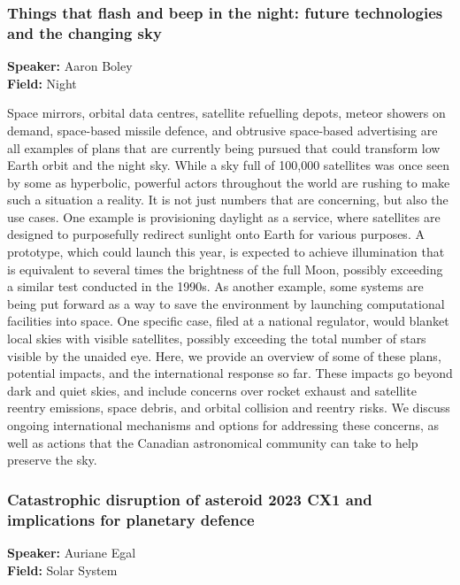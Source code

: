 \hypertarget{abstract-talk-305}{}\label{abstract-page-talk-305}
\subsubsection*{Things that flash and beep in the night: future technologies and the changing sky}
\textbf{Speaker:} Aaron Boley\\
\textbf{Field:} Night

Space mirrors, orbital data centres, satellite refuelling depots, meteor showers on demand, space-based missile defence, and obtrusive space-based advertising are all examples of plans that are currently being pursued that could transform low Earth orbit and the night sky. While a sky full of 100,000 satellites was once seen by some as hyperbolic, powerful actors throughout the world are rushing to make such a situation a reality. It is not just numbers that are concerning, but also the use cases. One example is provisioning daylight as a service, where satellites are designed to purposefully redirect sunlight onto Earth for various purposes. A prototype, which could launch this year, is expected to achieve illumination that is equivalent to several times the brightness of the full Moon, possibly exceeding a similar test conducted in the 1990s. As another example, some systems are being put forward as a way to save the environment by launching computational facilities into space. One specific case, filed at a national regulator, would blanket local skies with visible satellites, possibly exceeding the total number of stars visible by the unaided eye. Here, we provide an overview of some of these plans, potential impacts, and the international response so far. These impacts go beyond dark and quiet skies, and include concerns over rocket exhaust and satellite reentry emissions, space debris, and orbital collision and reentry risks. We discuss ongoing international mechanisms and options for addressing these concerns, as well as actions that the Canadian astronomical community can take to help preserve the sky.

\hypertarget{abstract-talk-177}{}\label{abstract-page-talk-177}
\subsubsection*{Catastrophic disruption of asteroid 2023 CX1 and implications for planetary defence}
\textbf{Speaker:} Auriane Egal\\
\textbf{Field:} Solar System

